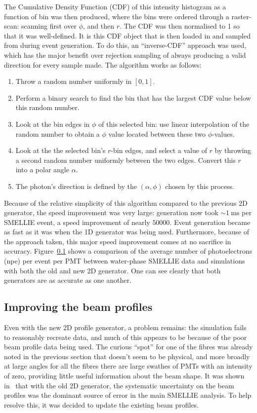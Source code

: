 The Cumulative Density Function (CDF) of this intensity histogram as a function of bin was then produced, where the bins were ordered through a raster-scan: scanning first over $\phi$, and then $r$. The CDF was then normalised to 1 so that it was well-defined. It is this CDF object that is then loaded in and sampled from during event generation. To do this, an ``inverse-CDF'' approach was used, which has the major benefit over rejection sampling of always producing a valid direction for every sample made. The algorithm works as follows:

\begin{enumerate}
    \item Throw a random number uniformly in $[0,1]$.
    \item Perform a binary search to find the bin that has the largest CDF value below this random number.
    \item Look at the bin edges in $\phi$ of this selected bin: use linear interpolation of the random number to obtain a $\phi$ value located between these two $\phi$-values.
    \item Look at the the selected bin's $r$-bin edges, and select a value of $r$ by throwing a second random number uniformly between the two edges. Convert this $r$ into a polar angle $\alpha$.
    \item The photon's direction is defined by the $(\alpha, \phi)$ chosen by this process. 
\end{enumerate}

Because of the relative simplicity of this algorithm compared to the previous 2D generator, the speed improvement was very large: generation now took $\sim\SI{1}{\milli\second}$ per SMELLIE event, a speed improvement of nearly $\si{50000}$. Event generation became as fast as it was when the 1D generator was being used. Furthermore, because of the approach taken, this major speed improvement comes at no sacrifice in accuracy. Figure~\ref{} shows a comparison of the average number of photoelectrons (npe) per event per PMT between water-phase SMELLIE data and simulations with both the old and new 2D generator. One can see clearly that both generators are as accurate as one another.

\subsection{Improving the beam profiles}
Even with the new 2D profile generator, a problem remains: the simulation fails to reasonably recreate data, and much of this appears to be because of the poor beam profile data being used. The curious ``spot'' for one of the fibres was already noted in the previous section that doesn't seem to be physical, and more broadly at large angles for all the fibres there are large swathes of PMTs with an intensity of zero, providing little useful information about the beam shape. It was shown in~\cite{} that with the old 2D generator, the systematic uncertainty on the beam profiles was the dominant source of error in the main SMELLIE analysis. To help resolve this, it was decided to update the existing beam profiles.

